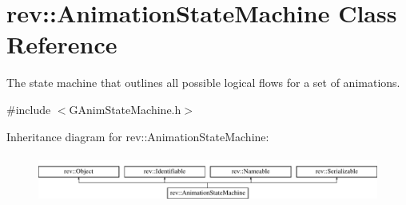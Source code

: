 \hypertarget{classrev_1_1_animation_state_machine}{}\section{rev\+::Animation\+State\+Machine Class Reference}
\label{classrev_1_1_animation_state_machine}


The state machine that outlines all possible logical flows for a set of animations.  




{\ttfamily \#include $<$G\+Anim\+State\+Machine.\+h$>$}

Inheritance diagram for rev\+::Animation\+State\+Machine\+:\begin{figure}[H]
\begin{center}
\leavevmode
\includegraphics[height=1.581921cm]{classrev_1_1_animation_state_machine}
\end{center}
\end{figure}
